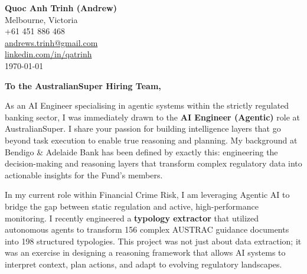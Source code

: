 \documentclass[11pt, a4paper]{article}
\begin{document}
\begin{flushleft}
\textbf{Quoc Anh Trinh (Andrew)} \\
Melbourne, Victoria \\
+61 451 886 468 \\
\href{mailto:andrews.trinh@gmail.com}{andrews.trinh@gmail.com} \\
\href{https://www.linkedin.com/in/qatrinh/}{linkedin.com/in/qatrinh} \\
\vspace{1em}
\today
\end{flushleft}

\vspace{1em}

\begin{flushleft}
\textbf{To the AustralianSuper Hiring Team,}
\end{flushleft}

\vspace{1em}

As an AI Engineer specialising in agentic systems within the strictly regulated banking sector, I was immediately drawn to the \textbf{AI Engineer (Agentic)} role at AustralianSuper. I share your passion for building intelligence layers that go beyond task execution to enable true reasoning and planning. My background at Bendigo \& Adelaide Bank has been defined by exactly this: engineering the decision-making and reasoning layers that transform complex regulatory data into actionable insights for the Fund’s members.

In my current role within Financial Crime Risk, I am leveraging Agentic AI to bridge the gap between static regulation and active, high-performance monitoring. I recently engineered a \textbf{typology extractor} that utilized autonomous agents to transform 156 complex AUSTRAC guidance documents into 198 structured typologies. This project was not just about data extraction; it was an exercise in designing a reasoning framework that allows AI systems to interpret context, plan actions, and adapt to evolving regulatory landscapes.
\end{document}
